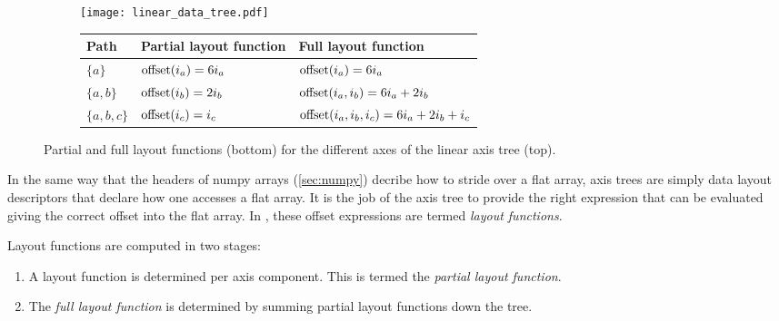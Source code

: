 \documentclass[thesis]{subfiles}
\begin{document}
\begin{figure}
  \centering

  \begin{subfigure}{.5\textwidth}
    \centering
    \texttt{[image: linear\_data\_tree.pdf]}
  \end{subfigure}

  \vspace{1em}

  \begin{subfigure}{\textwidth}
    \centering
    \begin{tabular}{|l|l|l|}
      \hline
      \textbf{Path} & \textbf{Partial layout function} & \textbf{Full layout function} \\
      \hline
      $\{a\}$ & $\textnormal{offset}(i_a) = 6 i_a$ & $\textnormal{offset}(i_a) = 6 i_a$ \\
      $\{a, b\}$ & $\textnormal{offset}(i_b) = 2 i_b$ & $\textnormal{offset}(i_a, i_b) = 6 i_a + 2 i_b$ \\
      $\{a, b, c\}$ & $\textnormal{offset}(i_c) = i_c$ & $\textnormal{offset}(i_a, i_b, i_c) = 6 i_a + 2 i_b + i_c$ \\
      \hline
    \end{tabular}
  \end{subfigure}
  \caption{
    Partial and full layout functions (bottom) for the different axes of the linear axis tree (top).
  }
  \label{fig:linear_axis_data_tree}
\end{figure}

In the same way that the headers of numpy arrays (\cref{sec:numpy}) decribe how to stride over a flat array, axis trees are simply data layout descriptors that declare how one accesses a flat array.
It is the job of the axis tree to provide the right expression that can be evaluated giving the correct offset into the flat array.
In , these offset expressions are termed \textit{layout functions}.

Layout functions are computed in two stages:

\begin{enumerate}
  \item
    A layout function is determined per axis component.
    This is termed the \textit{partial layout function}.

  \item
    The \textit{full layout function} is determined by summing partial layout functions down the tree.
\end{enumerate}
\end{document}
